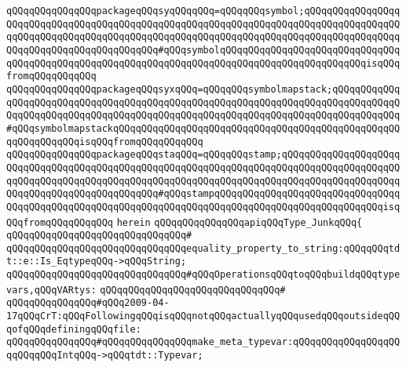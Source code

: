 \verb|qQQqqQQqqQQqqQQqpackageqQQqsyqQQqqQQq=qQQqqQQqsymbol;qQQqqQQqqQQqqQQqqQQqqQQqqQQqqQQqqQQqqQQqqQQqqQQqqQQqqQQqqQQqqQQqqQQqqQQqqQQqqQQqqQQqqQQqqQQqqQQqqQQqqQQqqQQqqQQqqQQqqQQqqQQqqQQqqQQqqQQqqQQqqQQqqQQqqQQqqQQqqQQqqQQqqQQqqQQqqQQqqQQqqQQq#qQQqsymbolqQQqqQQqqQQqqQQqqQQqqQQqqQQqqQQqqQQqqQQqqQQqqQQqqQQqqQQqqQQqqQQqqQQqqQQqqQQqqQQqqQQqqQQqqQQqqQQqisqQQqfromqQQqqQQqqQQq|\newline
\verb|qQQqqQQqqQQqqQQqpackageqQQqsyxqQQq=qQQqqQQqsymbolmapstack;qQQqqQQqqQQqqQQqqQQqqQQqqQQqqQQqqQQqqQQqqQQqqQQqqQQqqQQqqQQqqQQqqQQqqQQqqQQqqQQqqQQqqQQqqQQqqQQqqQQqqQQqqQQqqQQqqQQqqQQqqQQqqQQqqQQqqQQqqQQqqQQqqQQqqQQq#qQQqsymbolmapstackqQQqqQQqqQQqqQQqqQQqqQQqqQQqqQQqqQQqqQQqqQQqqQQqqQQqqQQqqQQqqQQqisqQQqfromqQQqqQQqqQQq|\newline
\verb|qQQqqQQqqQQqqQQqpackageqQQqstaqQQq=qQQqqQQqstamp;qQQqqQQqqQQqqQQqqQQqqQQqqQQqqQQqqQQqqQQqqQQqqQQqqQQqqQQqqQQqqQQqqQQqqQQqqQQqqQQqqQQqqQQqqQQqqQQqqQQqqQQqqQQqqQQqqQQqqQQqqQQqqQQqqQQqqQQqqQQqqQQqqQQqqQQqqQQqqQQqqQQqqQQqqQQqqQQqqQQqqQQqqQQq#qQQqstampqQQqqQQqqQQqqQQqqQQqqQQqqQQqqQQqqQQqqQQqqQQqqQQqqQQqqQQqqQQqqQQqqQQqqQQqqQQqqQQqqQQqqQQqqQQqqQQqqQQqisqQQqfromqQQqqQQqqQQq|\newline
\verb|herein|\newline
\newline
\verb|qQQqqQQqqQQqqQQqapiqQQqType_JunkqQQq{|\newline
\verb|qQQqqQQqqQQqqQQqqQQqqQQqqQQqqQQq#|\newline
\verb|qQQqqQQqqQQqqQQqqQQqqQQqqQQqqQQqequality_property_to_string:qQQqqQQqtdt::e::Is_EqtypeqQQq->qQQqString;|\newline
\newline
\verb|qQQqqQQqqQQqqQQqqQQqqQQqqQQqqQQq#qQQqOperationsqQQqtoqQQqbuildqQQqtypevars,qQQqVARtys:|\newline
\verb|qQQqqQQqqQQqqQQqqQQqqQQqqQQqqQQq#|\newline
\verb|qQQqqQQqqQQqqQQq#qQQq2009-04-17qQQqCrT:qQQqFollowingqQQqisqQQqnotqQQqactuallyqQQqusedqQQqoutsideqQQqofqQQqdefiningqQQqfile:|\newline
\verb|qQQqqQQqqQQqqQQq#qQQqqQQqqQQqqQQqmake_meta_typevar:qQQqqQQqqQQqqQQqqQQqqQQqqQQqIntqQQq->qQQqtdt::Typevar;|\newline
